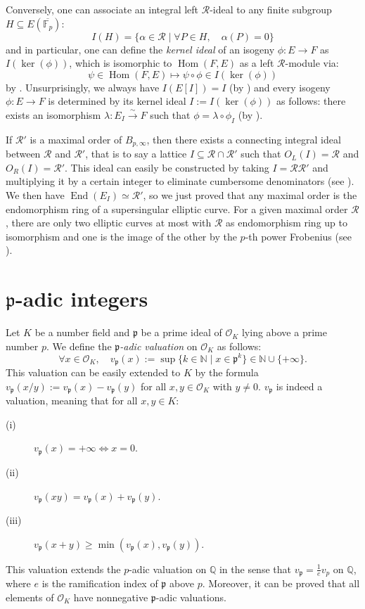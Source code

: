 \documentclass[a4paper,10pt]{report}
\theoremstyle{definition}
\theoremstyle{plain}
\theoremstyle{definition}
\newcommand{\N}{\mathbb{N}}
\newcommand{\Q}{\mathbb{Q}}
\newcommand{\F}{\mathbb{F}}
\newcommand{\m}[1]{\mathcal{#1}}
\newcommand{\mO}{\mathcal{O}}
\renewcommand{\(}{\left(}
\renewcommand{\)}{\right)}
\newcommand{\mf}[1]{\mathfrak{#1}}
\DeclareMathOperator{\Hom}{Hom}
\DeclareMathOperator{\End}{End}
\begin{document}
Conversely, one can associate an integral left $\m{R}$-ideal to any finite subgroup $H\subseteq E(\overline{\F_p})$:
\[I(H)=\{\alpha\in\m{R}\mid\forall P\in H, \quad \alpha(P)=0\}\]
and in particular, one can define the \emph{kernel ideal} of an isogeny $\phi : E\longrightarrow F$ as $I(\ker(\phi))$, which is isomorphic to $\Hom(F,E)$ as a left $\m{R}$-module via:
\[\psi\in\Hom(F,E) \longmapsto \psi\circ\phi\in I(\ker(\phi)) \]
by \cite[Lemma 42.2.7]{Voight}. Unsurprisingly, we always have $I(E[I])=I$ (by \cite[Proposition 42.2.16.(b)]{Voight}) and every isogeny $\phi :E\longrightarrow F$ is determined by its kernel ideal $I:=I(\ker(\phi))$ as follows: there exists an isomorphism $\lambda : E_I\overset{\sim}{\longrightarrow} F$ such that $\phi=\lambda\circ\phi_I$ (by \cite[Corollary 42.2.21]{Voight}).

If $\m{R}'$ is a maximal order of $B_{p,\infty}$, then there exists a connecting integral ideal between $\m{R}$ and $\m{R}'$, that is to say a lattice $I\subseteq \m{R}\cap\m{R}'$ such that $O_L(I)=\m{R}$ and $O_R(I)=\m{R}'$. This ideal can easily be constructed by taking $I=\m{R}\m{R}'$ and multiplying it by a certain integer to eliminate cumbersome denominators (see \cite[Lemma 17.4.7]{Voight}). We then have $\End(E_I)\simeq\m{R}'$, so we just proved that any maximal order is the endomorphism ring of a supersingular elliptic curve. For a given maximal order $\m{R}$, there are only two elliptic curves at most with $\m{R}$ as endomorphism ring up to isomorphism and one is the image of the other by the $p$-th power Frobenius (see \cite[Lemma 42.4.1]{Voight}).   

\section{$\mf{p}$-adic integers}

Let $K$ be a number field and $\mf{p}$ be a prime ideal of $\mO_K$ lying above a prime number $p$. We define the \emph{$\mf{p}$-adic valuation} on $\mO_K$ as follows:
\[\forall x\in\mO_K, \quad v_{\mf{p}}(x):=\sup\{k\in\N\mid x\in\mf{p}^k\}\in\N\cup\{+\infty\}.\]
This valuation can be easily extended to $K$ by the formula $v_{\mf{p}}(x/y):=v_{\mf{p}}(x)-v_{\mf{p}}(y)$ for all $x,y\in\mO_K$ with $y\neq 0$.  $v_{\mf{p}}$ is indeed a valuation, meaning that for all $x,y\in K$:
\begin{description}
\item[(i)] $v_{\mf{p}}(x)=+\infty\Longleftrightarrow x=0$.
\item[(ii)] $v_{\mf{p}}(xy)=v_{\mf{p}}(x)+v_{\mf{p}}(y)$.
\item[(iii)] $v_{\mf{p}}(x+y)\geq\min(v_{\mf{p}}(x),v_{\mf{p}}(y))$.
\end{description}
This valuation extends the $p$-adic valuation on $\Q$ in the sense that $v_{\mf{p}}=\frac{1}{e}v_p$ on $\Q$, where $e$ is the ramification index of $\mf{p}$ above $p$. Moreover, it can be proved that all elements of $\mO_K$ have nonnegative $\mf{p}$-adic valuations.  
\end{document}
